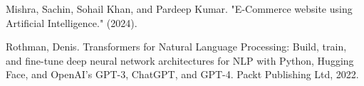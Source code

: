 \documentclass[10pt,conference]{IEEEtran}
\begin{document}
\begin{thebibliography}{99}
Mishra, Sachin, Sohail Khan, and Pardeep Kumar. "E-Commerce website using Artificial Intelligence." (2024).

Rothman, Denis. Transformers for Natural Language Processing: Build, train, and fine-tune deep neural network architectures for NLP with Python, Hugging Face, and OpenAI's GPT-3, ChatGPT, and GPT-4. Packt Publishing Ltd, 2022.

\end{thebibliography}
\end{document}
